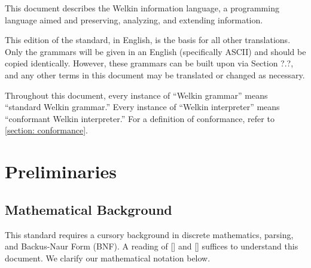

This document describes the Welkin information language, a programming language aimed and preserving, analyzing, and extending information.


This edition of the standard, in English, is the basis for all other translations. Only the grammars will be given in an English (specifically ASCII) and should be copied identically. However, these grammars can be built upon via Section ?.?, and any other terms in this document may be translated or changed as necessary.

Throughout this document, every instance of ``Welkin grammar'' means ``standard Welkin grammar.'' Every instance of ``Welkin interpreter'' means ``conformant Welkin interpreter.'' For a definition of conformance, refer to \ref{section: conformance}.

\section{Preliminaries}

\newcommand*{\chars}{\mathrm{CHAR}}
\newcommand*{\numbers}{\mathrm{NUMBERS}}
\newcommand*{\whitespaces}{\mathrm{WHITE\_SPACES}}
\newcommand*{\reserved}{\mathrm{RESERVED}}
\newcommand*{\strings}{\mathrm{STRING}}
\newcommand*{\term}{\mathrm{term}}
\newcommand*{\terms}{\mathrm{terms}}
\newcommand*{\delimiters}{\mathrm{DELIMITERS}}
\newcommand*{\escapes}{\mathrm{STRING\_ESCAPES}}
\newcommand*{\encoding}{\mathcal{E}}
\newcommand*{\decoding}{\mathcal{D}}
\newcommand*{\can}{\textrm{Can}}
\newcommand*{\bnfs}{\mathrm{BNF}}


\newcommand*{\scope}{\textrm{scope}}

\subsection{Mathematical Background}
This standard requires a cursory background in discrete mathematics, parsing, and Backus-Naur Form (BNF). A reading of [] and [] suffices to understand this document. We clarify our mathematical notation below.

